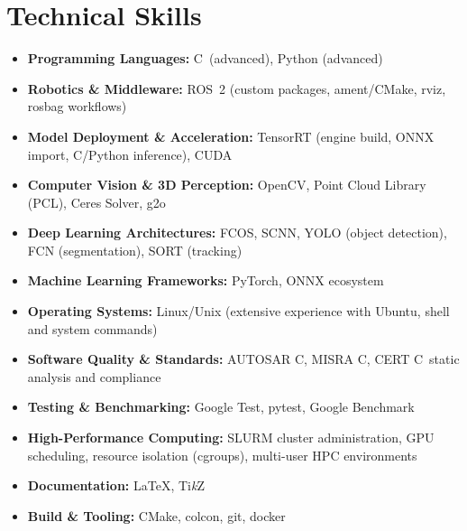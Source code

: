 \documentclass[a4paper,10pt,dvipdfmx]{article}
\def\CC{{C\nolinebreak[4]\hspace{-.05em}\raisebox{.4ex}{\tiny\bf ++}}}
\begin{document}
\section*{Technical Skills}
\begin{itemize}[noitemsep,nolistsep]
  \item \textbf{Programming Languages:} \CC~(advanced), Python (advanced)
  \item \textbf{Robotics \& Middleware:} ROS~2 (custom packages, ament/CMake, rviz, rosbag workflows)
  \item \textbf{Model Deployment \& Acceleration:} TensorRT (engine build, ONNX import, \CC/Python inference), CUDA
  \item \textbf{Computer Vision \& 3D Perception:} OpenCV, Point Cloud Library (PCL), Ceres Solver, g2o
  \item \textbf{Deep Learning Architectures:} FCOS, SCNN, YOLO (object detection), FCN (segmentation), SORT (tracking)
  \item \textbf{Machine Learning Frameworks:} PyTorch, ONNX ecosystem
  \item \textbf{Operating Systems:} Linux/Unix (extensive experience with Ubuntu, shell and system commands)
  \item \textbf{Software Quality \& Standards:} AUTOSAR \CC, MISRA \CC, CERT \CC~static analysis and compliance
  \item \textbf{Testing \& Benchmarking:} Google Test, pytest, Google Benchmark
  \item \textbf{High-Performance Computing:} SLURM cluster administration, GPU scheduling, resource isolation (cgroups), multi-user HPC environments
  \item \textbf{Documentation:} \LaTeX, Ti\textit{k}Z
  \item \textbf{Build \& Tooling:} CMake, colcon, git, docker
\end{itemize}
\end{document}
